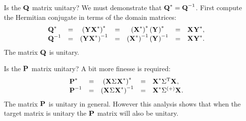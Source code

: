 Is the $\Q{}$ matrix unitary? We must demonstrate that $\Q{*}=\Q{-1}$. First compute the Hermitian conjugate in terms of the domain matrices:
\begin{equation}
  \begin{array}{lcccccl}
    \Q{*}  &=& \paren{\Y{}\X{*}}^{*}  &=& \paren{\X{*}}^{*}\paren{\Y{}}^{*} &=& \X{}\Y{*},\\
    \Q{-1} &=& \paren{\Y{}\X{*}}^{-1} &=& \paren{\X{*}}^{-1}\paren{\Y{}}^{-1} &=& \X{}\Y{*}.
  \end{array}
\end{equation}
The matrix $\Q{}$ is unitary.

Is the $\pee{}$ matrix unitary? A bit more finesse is required:
\begin{equation}
  \begin{array}{lcccl}
    \pee{*}  &=& \paren{\X{}\sig{}\X{*}}^{*}  &=& \X{*}\sig{T}\X{},\\
    \pee{-1} &=& \paren{\X{}\sig{}\X{*}}^{-1} &=& \X{*}\sig{(+)}\X{}.
  \end{array}
\end{equation}
The matrix $\pee{}$ is unitary in general. However this analysis shows that when the target matrix is unitary the $\pee{}$ matrix will also be unitary.

